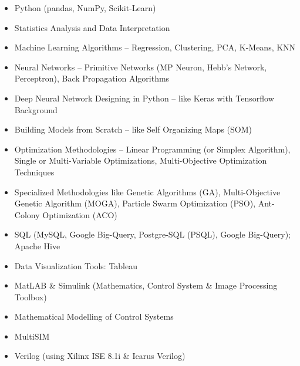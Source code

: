 
%




\begin{multicols}{2}
	\begin{itemize}
		\item Python (pandas, NumPy, Scikit-Learn)
		\item Statistics Analysis and Data Interpretation
		\item Machine Learning Algorithms – Regression, Clustering, PCA, K-Means, KNN
		\item Neural Networks – Primitive Networks (MP Neuron, Hebb’s Network, Perceptron), Back Propagation Algorithms
		\item Deep Neural Network Designing in Python – like Keras with Tensorflow Background
		\item Building Models from Scratch – like Self Organizing Maps (SOM)
		\item Optimization Methodologies – Linear Programming (or Simplex Algorithm), Single or Multi-Variable Optimizations, Multi-Objective Optimization Techniques
		\item Specialized Methodologies like Genetic Algorithms (GA), Multi-Objective Genetic Algorithm (MOGA), Particle Swarm Optimization (PSO), Ant-Colony Optimization (ACO)
		\item SQL (MySQL, Google Big-Query, Postgre-SQL (PSQL), Google Big-Query); Apache Hive
		\item Data Visualization Tools: Tableau
	\end{itemize}

	\begin{itemize}
		\item MatLAB \& Simulink (Mathematics, Control System \& Image Processing Toolbox)
		\item Mathematical Modelling of Control Systems
		\item MultiSIM
		\item Verilog (using Xilinx ISE 8.1i \& Icarus Verilog)
	\end{itemize}
\end{multicols}